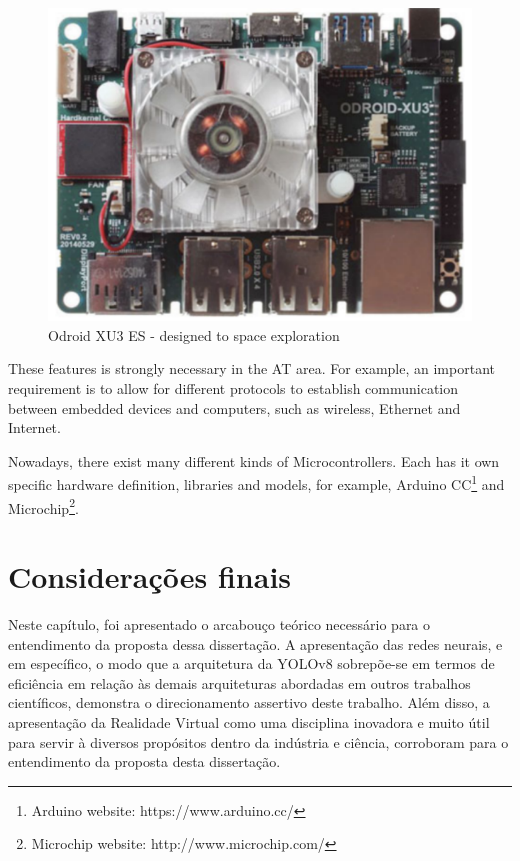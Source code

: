 \begin{figure}[!hbt]
\begin{center}
\includegraphics[width=0.7 \textwidth]{img/cap2/OdroidXU3-ES}
\caption{Odroid XU3 ES - designed to space exploration \cite{marwedel2018}}
\label{fig:OdroidXU3-ES}
\end{center}
\end{figure}



These features is strongly necessary in the AT area. For example, an important requirement is to allow for different protocols to establish communication between embedded devices and computers, such as wireless, Ethernet and Internet.

Nowadays, there exist many different kinds of Microcontrollers. Each has it own specific hardware definition, libraries and models, for example, Arduino CC\footnote{Arduino website: https://www.arduino.cc/} and Microchip\footnote{Microchip website: http://www.microchip.com/}.

\section{Considerações finais}

Neste capítulo, foi apresentado o arcabouço teórico necessário para o entendimento da proposta dessa dissertação. A apresentação das redes neurais, e em específico, o modo que a arquitetura da YOLOv8 sobrepõe-se em termos de eficiência em relação às demais arquiteturas abordadas em outros trabalhos científicos, demonstra o direcionamento assertivo deste trabalho. Além disso, a apresentação da Realidade Virtual como uma disciplina inovadora e muito útil para servir à diversos propósitos dentro da indústria e ciência, corroboram para o entendimento da proposta desta dissertação.
